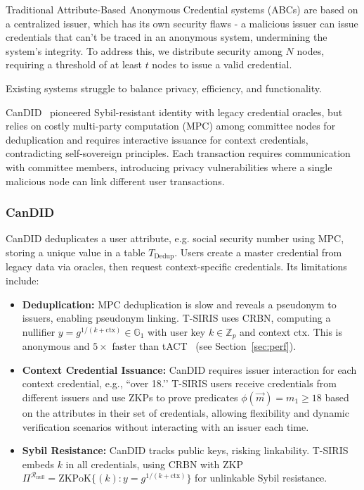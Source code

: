 Traditional Attribute-Based Anonymous Credential systems (ABCs) are based on a centralized issuer, which has its own security flaws - a malicious issuer can issue credentials that can't be traced in an anonymous system, undermining the system's integrity. To address this, we distribute security among $N$ nodes, requiring a threshold of at least $t$ nodes to issue a valid credential. 

Existing systems struggle to balance privacy, efficiency, and functionality. 

CanDID~\cite{maram2021candid} pioneered Sybil-resistant identity with legacy credential oracles, but relies on costly multi-party computation (MPC) among committee nodes for deduplication and requires interactive issuance for context credentials, contradicting self-sovereign principles. Each transaction requires communication with committee members, introducing privacy vulnerabilities where a single malicious node can link different user transactions.

\subsubsection*{CanDID}
CanDID deduplicates a user attribute, e.g. social security number using MPC, storing a unique value in a table $T_{\text{Dedup}}$. Users create a master credential from legacy data via oracles, then request context-specific credentials. Its limitations include:

\begin{itemize}
    \item \textbf{Deduplication:} MPC deduplication is slow and reveals a pseudonym to issuers, enabling pseudonym linking. T-SIRIS uses CRBN, computing a nullifier $y = g^{1/(k + \text{ctx})} \in \mathbb{G}_1$ with user key $k \in \mathbb{Z}_p$ and context $\text{ctx}$. This is anonymous and $5\times$ faster than tACT~\cite{rabaninejad_attribute-based_2024} (see Section~\ref{sec:perf}).
    
    \item \textbf{Context Credential Issuance:} CanDID requires issuer interaction for each context credential, e.g., ``over 18.’’ T-SIRIS users receive credentials from different issuers and use ZKPs to prove predicates $\phi(\vec{m}) = m_1 \geq 18$ based on the attributes in their set of credentials, allowing flexibility and dynamic verification scenarios without interacting with an issuer each time. 
    
    \item \textbf{Sybil Resistance:} CanDID tracks public keys, risking linkability. T-SIRIS embeds $k$ in all credentials, using CRBN with ZKP $\Pi^{\mathcal{R}_{\text{null}}} = \text{ZKPoK}\{(k): y = g^{1/(k + \text{ctx})}\}$ for unlinkable Sybil resistance.
\end{itemize}

